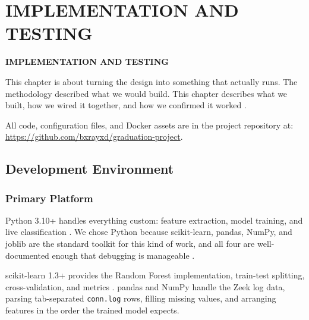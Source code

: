 \chapter{IMPLEMENTATION AND TESTING}
\pagebreak

\begin{center}
{\LARGE\textbf{IMPLEMENTATION AND TESTING}}
\end{center}


This chapter is about turning the design into something that actually runs. The methodology described what we would build. This chapter describes what we built, how we wired it together, and how we confirmed it worked \cite{lee2021classification,9071014,9558948}.

All code, configuration files, and Docker assets are in the project repository at: \url{https://github.com/bxrayxd/graduation-project}.

\section{Development Environment}
\label{sec:dev_environment}

\subsection{Primary Platform}
\label{subsec:primary_platform}

Python 3.10+ handles everything custom: feature extraction, model training, and live classification \cite{optimized2024arxiv,karim2024efficient}. We chose Python because scikit-learn, pandas, NumPy, and joblib are the standard toolkit for this kind of work, and all four are well-documented enough that debugging is manageable \cite{dimauro2021supervised,lee2021classification}.

scikit-learn 1.3+ provides the Random Forest implementation, train-test splitting, cross-validation, and metrics \cite{lee2021classification,saied2023comparative,karim2024efficient}. pandas and NumPy handle the Zeek log data, parsing tab-separated \texttt{conn.log} rows, filling missing values, and arranging features in the order the trained model expects.


